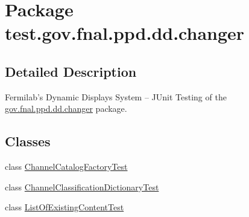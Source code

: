 \hypertarget{namespacetest_1_1gov_1_1fnal_1_1ppd_1_1dd_1_1changer}{\section{Package test.\-gov.\-fnal.\-ppd.\-dd.\-changer}
\label{namespacetest_1_1gov_1_1fnal_1_1ppd_1_1dd_1_1changer}
}


\subsection{Detailed Description}
Fermilab's Dynamic Displays System -- J\-Unit Testing of the \hyperlink{namespacetest_1_1gov_1_1fnal_1_1ppd_1_1dd_1_1changer}{gov.\-fnal.\-ppd.\-dd.\-changer} package.\subsection*{Classes}
\begin{DoxyCompactItemize}
\item 
class \hyperlink{classtest_1_1gov_1_1fnal_1_1ppd_1_1dd_1_1changer_1_1ChannelCatalogFactoryTest}{Channel\-Catalog\-Factory\-Test}
\item 
class \hyperlink{classtest_1_1gov_1_1fnal_1_1ppd_1_1dd_1_1changer_1_1ChannelClassificationDictionaryTest}{Channel\-Classification\-Dictionary\-Test}
\item 
class \hyperlink{classtest_1_1gov_1_1fnal_1_1ppd_1_1dd_1_1changer_1_1ListOfExistingContentTest}{List\-Of\-Existing\-Content\-Test}
\end{DoxyCompactItemize}
